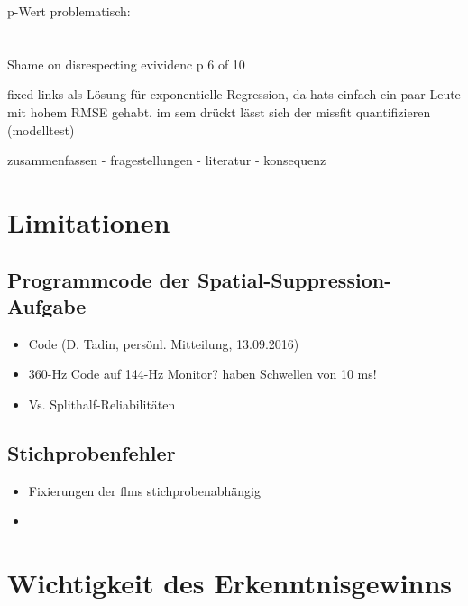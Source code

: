 \documentclass[11pt, twoside, a4paper]{book}		%
\begin{document}
p-Wert problematisch:\\
\citet{Gelman2006}\\
\citet{Wasserstein2016}\\
\citet{Nuzzo2014}
\citet{Hayduk2014} Shame on disrespecting evividenc p 6 of 10


fixed-links als Lösung für exponentielle Regression, da hats einfach ein paar Leute mit hohem RMSE gehabt. im sem drückt lässt sich der missfit quantifizieren (modelltest)





zusammenfassen
- fragestellungen
- literatur
- konsequenz

\section{Limitationen}

\subsection{Programmcode der Spatial-Suppression-Aufgabe}

\begin{itemize}
	\item Code (D. Tadin, persönl. Mitteilung, 13.09.2016)
	\item 360-Hz Code auf 144-Hz Monitor? \citet{Lappin2009, Tadin2006} haben Schwellen von 10 ms!
	\item Vs. Splithalf-Reliabilitäten
\end{itemize}





\subsection{Stichprobenfehler}

\begin{itemize}
	\item Fixierungen der \glspl{flm} stichprobenabhängig
	\item 
\end{itemize}


\section{Wichtigkeit des Erkenntnisgewinns}



\end{document}
